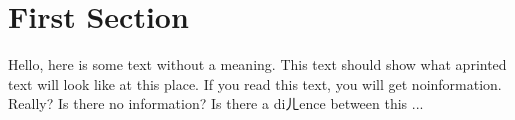 \documentclass{article}
\begin{document}
 
\section{First Section}
 
Hello,  here  is  some  text  without  a  meaning.   This  
text  should  show  what  aprinted text will look like at 
this place.  If you read this text, you will get noinformation.  
Really?  Is there no information?  Is there a diㄦence between 
this ...
 
\end{document}
